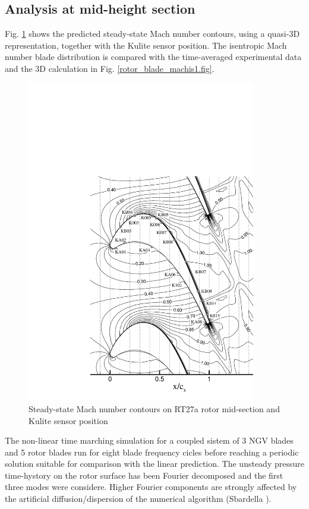 \subsection{Analysis at mid-height section}
%
 Fig. \ref{rotor_mac_kul.fig} shows the predicted steady-state Mach number
 contours, using a quasi-3D representation,
 together with the Kulite sensor position.
 The isentropic Mach number blade distribution is compared with the time-averaged
 experimental data and the 3D calculation in Fig.
 \ref{rotor_blade_machis1.fig}.
%
%
\begin{figure}[ht]
   \centerline{\includegraphics[width=100mm,clip=t]{CHAP_RT27/FIGURE/rot_mac_kul.pdf}}
   \caption{Steady-state Mach number contours on RT27a rotor mid-section
            and Kulite sensor position}
   \label{rotor_mac_kul.fig}
\end{figure}
%
%
 The non-linear time marching simulation for a coupled sistem of 3 NGV blades
 and 5 rotor blades run for eight blade frequency cicles before reaching a periodic
 solution suitable for comparison with the linear prediction.
 The unsteady pressure time-hystory on the rotor surface has been Fourier
 decomposed and the first three modes were considere.
 Higher Fourier components are strongly affected by the artificial
 diffusion/dispersion of the
 numerical algorithm (Sbardella ).

